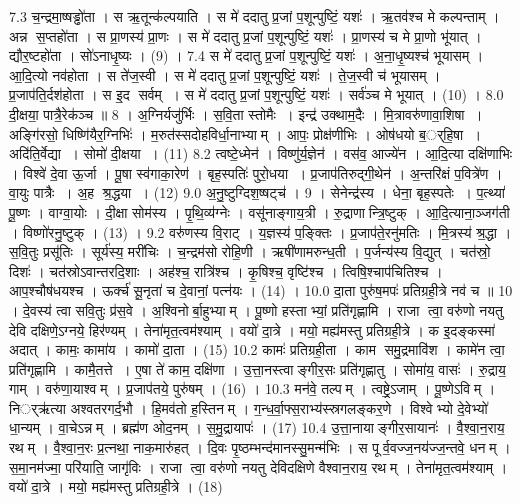 7.3
च॒न्द्रमा॒ष्षड्ढो॑ता । स ऋ॒तून्क॑ल्पयाति । स मे॑ ददातु प्र॒जां प॒शून्पुष्टिं॒ यशः॑ । ऋ॒तव॑श्च मे कल्पन्ताम् । अन्न स॒प्तहो॑ता । स प्रा॒णस्य॑ प्रा॒णः । स मे॑ ददातु प्र॒जां प॒शून्पुष्टिं॒ यशः॑ । प्रा॒णस्य॑ च मे प्रा॒णो भू॑यात् । द्यौर॒ष्टहो॑ता । सो॑ऽनाधृ॒ष्यः । (9) ।
7.4
स मे॑ ददातु प्र॒जां प॒शून्पुष्टिं॒ यशः॑ । अ॒ना॒धृ॒ष्यश्च॑ भूयासम् । आ॒दि॒त्यो नव॑होता । स ते॑ज॒स्वी । स मे॑ ददातु प्र॒जां प॒शून्पुष्टिं॒ यशः॑ । ते॒ज॒स्वी च॑ भूयासम् । प्र॒जाप॑ति॒र्दश॑होता । स इ॒द सर्वम् । स मे॑ ददातु प्र॒जां प॒शून्पुष्टिं॒ यशः॑ । सर्व॑ञ्च मे भूयात् । (10) ।
8.0
दी॒क्षया॒ पात्रै॒रेक॑ञ्च ॥ 8 ।
अ॒ग्निर्यजु॑र्भिः । स॒वि॒ता स्तोमैः । इन्द्र॑ उक्थाम॒दैः । मि॒त्रावरु॑णावा॒शिषा । अङ्गि॑रसो॒ धिष्णि॑यैर॒ग्निभिः॑ । म॒रुत॑स्सदोहविर्धा॒नाभ्याम् । आपः॒ प्रोक्ष॑णीभिः । ओष॑धयो ब॒र््हि॒षा । अदि॑ति॒र्वेद्या । सोमो॑ दी॒क्षया । (11)
8.2
त्वष्टे॒ध्मेन॑ । विष्णु॑र्य॒ज्ञेन॑ । वस॑व॒ आज्ये॑न । आ॒दि॒त्या दक्षि॑णाभिः । विश्वे॑ दे॒वा ऊ॒र्जा । पू॒षा स्व॑गाका॒रेण॑ । बृह॒स्पतिः॑ पुरो॒धया । प्र॒जाप॑तिरुद्गी॒थेन॑ । अ॒न्तरि॑क्षं प॒वित्रे॑ण । वा॒युः पात्रैः । अ॒ह श्र॒द्धया । (12)
9.0
अ॒नु॒ष्टुग्दिश॒ष्षट्च॑ । 9 ।
सेनेन्द्र॑स्य । धेना॒ बृह॒स्पतेः । प॒त्थ्या॑ पू॒ष्णः । वाग्वा॒योः । दी॒क्षा सोम॑स्य । पृ॒थि॒व्य॑ग्नेः । वसू॑नाङ्गाय॒त्री । रु॒द्राणान्त्रि॒ष्टुक् । आ॒दि॒त्याना॒ञ्जग॑ती । विष्णो॑रनु॒ष्टुक् । (13) ।
9.2
वरु॑णस्य वि॒राट् । य॒ज्ञस्य॑ प॒ङ्क्तिः । प्र॒जाप॑ते॒रनु॑मतिः । मि॒त्रस्य॑ श्र॒द्धा । स॒वि॒तुः प्रसू॑तिः । सूर्य॑स्य॒ मरी॑चिः । च॒न्द्रम॑सो रोहि॒णी । ऋषी॑णामरुन्ध॒ती । प॒र्जन्य॑स्य वि॒द्युत् । चत॑स्रो॒ दिशः॑ । चत॑स्रोऽवान्तरदि॒शाः । अह॑श्च॒ रात्रि॑श्च । कृ॒षिश्च॒ वृष्टि॑श्च । त्विषि॒श्चाप॑चितिश्च । आप॒श्चौष॑धयश्च । ऊर्क्च॑ सू॒नृता॑ च दे॒वानां॒ पत्न॑यः । (14) ।
10.0
दा॒ता पुरु॑ष॒मपः॑ प्रतिग्रही॒त्रे नव॑ च ॥ 10 ।
दे॒वस्य॑ त्वा सवि॒तुः प्र॑स॒वे । अ॒श्विनोर्बा॒हुभ्याम् । पू॒ष्णो हस्ताभ्यां॒ प्रति॑गृह्णामि । राजा त्वा॒ वरु॑णो नयतु देवि दक्षिणे॒ऽग्नये॒ हिर॑ण्यम् । तेना॑मृत॒त्वम॑श्याम् । वयो॑ दा॒त्रे । मयो॒ मह्य॑मस्तु प्रतिग्रही॒त्रे । क इ॒दङ्कस्मा॑ अदात् । कामः॒ कामा॑य । कामो॑ दा॒ता । (15)
10.2
कामः॑ प्रतिग्रही॒ता । काम समु॒द्रमावि॑श । कामे॑न त्वा॒ प्रति॑गृह्णामि । कामै॒तत्ते । ए॒षा ते॑ काम॒ दक्षि॑णा । उ॒त्ता॒नस्त्वाङ्गीर॒सः प्रति॑गृह्णातु । सोमा॑य॒ वासः॑ । रु॒द्राय॒ गाम् । वरु॑णा॒याश्वम् । प्र॒जाप॑तये॒ पुरु॑षम् । (16) ।
10.3
मन॑वे॒ तल्पम् । त्वष्ट्रे॒ऽजाम् । पू॒ष्णेऽविम् । निर््ऋ॑त्या अश्वतरगर्द॒भौ । हि॒मव॑तो ह॒स्तिनम् । ग॒न्ध॒र्वा॒फ्स॒राभ्य॑स्स्रगलङ्कर॒णे । विश्वेभ्यो दे॒वेभ्यो॑ धा॒न्यम् । वा॒चेऽन्नम् । ब्रह्म॑ण ओद॒नम् । स॒मु॒द्रायापः॑ । (17)
10.4
उ॒त्ता॒नायाङ्गीर॒सायानः॑ । वै॒श्वा॒न॒राय॒ रथम् । वै॒श्वा॒न॒रः प्र॒त्नथा॒ नाक॒मारु॑हत् । दि॒वः पृ॒ष्ठम्भन्द॑मानस्सु॒मन्म॑भिः । स पूर्व॒वज्ज॒नय॑ज्ज॒न्तवे॒ धनम् । स॒मा॒नम॑ज्मा॒ परि॑याति॒ जागृ॑विः । राजा त्वा॒ वरु॑णो नयतु देविदक्षिणे वैश्वान॒राय॒ रथम् । तेना॑मृत॒त्वम॑श्याम् । वयो॑ दा॒त्रे । मयो॒ मह्य॑मस्तु प्रतिग्रही॒त्रे । (18)
